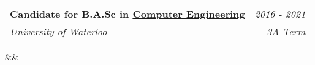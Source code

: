 \documentclass[11.9pt,letterpaper,sans]{moderncv}
\makeatletter
\renewcommand*{\cventry}[7][.25em]{
  \begin{tabular*}{\textwidth}{l@{\extracolsep{\fill}}r}%
      {\bfseries #3\ifthenelse{\equal{#6}{}}{}{, #6}} & {\itshape #2}\\%
      {\itshape #4} & {\itshape #5}\\%
  \end{tabular*}%
  \ifx&#7&%
    \else{\\\vbox{\small#7}}\fi%
  \par\addvspace{#1}}
\makeatother
\begin{document}
\cventry{2016 - 2021}{Candidate for B.A.Sc in \href{https://uwaterloo.ca/electrical-computer-engineering/future-undergraduate-students/computer-engineering}{Computer Engineering}}{\protect\hspace{2px}\href{http://uwaterloo.ca}{University of Waterloo}}{3A Term}{}{}




\end{document}

